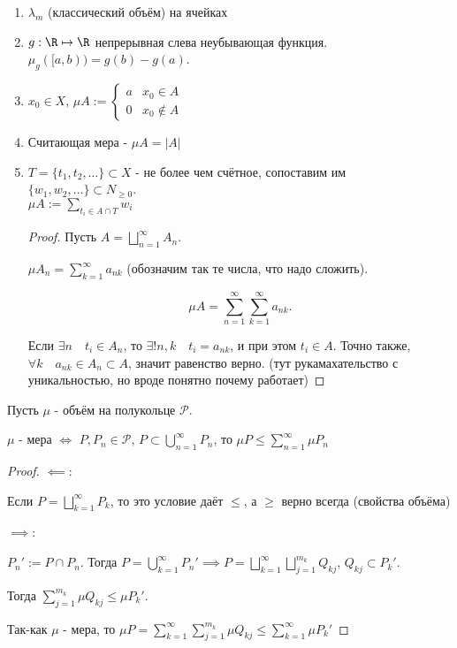 \begin{example}[меры] \thmslashn

    \begin{enumerate}
        \item $\lambda_{m}$ (классический объём) на ячейках
        \item $g : \R \mapsto \R$ непрерывная слева неубывающая функция. $\mu_{g}([a, b)) = g(b) - g(a)$.
        \item $x_0\in X$, $\mu A := \begin{cases}
                a & x_0\in A\\
                0 & x_0 \not\in A
        \end{cases}$
    \item Считающая мера - $\mu A = |A|$
    \item $T = \{t_1, t_2, \ldots\} \subset X $ - не более чем счётное, сопоставим им $\{w_1, w_2, \ldots\} \subset N_{\ge 0}$.\\
        $\mu A := \sum\limits_{t_{i}\in A\cap T} w_{i}$
        \begin{proof} \thmslashn
        
            Пусть $A = \bigsqcup\limits_{n=1}^{\infty} A_{n}$.

            $\mu A_{n} = \sum\limits_{k=1}^{\infty} a_{nk}$ (обозначим так те числа, что надо сложить).

            \[ \mu A = \sum\limits_{n=1}^{\infty} \sum\limits_{k=1}^{\infty} a_{nk} .\]

            Если $\exists{n}\quad t_{i}\in A_{n}$, то $\exists!{n, k}\quad t_{i} = a_{nk}$, и при этом $t_{i}\in A$. Точно также, $\forall{k}\quad a_{nk}\in A_{n} \subset A$, значит равенство верно. (тут рукамахательство с уникальностью, но вроде понятно почему работает)
        \end{proof}
    \end{enumerate}
\end{example}
\begin{theorem} \thmslashn

    Пусть $\mu$ - объём на полукольце $\mathcal{P}$.

    $\mu$ - мера $\iff$ $P, P_{n}\in \mathcal{P}$, $P \subset \bigcup\limits_{n=1}^{\infty} P_{n}$, то $\mu P \le \sum\limits_{n=1}^{\infty} \mu P_{n}$
    \begin{proof} \thmslashn
    
        $\impliedby$:

        Если $P = \bigsqcup\limits_{k=1}^{\infty} P_{k}$, то это условие даёт $\le $, а $\ge $ верно всегда (свойства объёма)

        $\implies$:

        $P_{n}' := P\cap P_{n}$. Тогда $P = \bigcup\limits_{k=1}^{\infty} P_{n}' \implies P = \bigsqcup\limits_{k=1}^{\infty} \bigsqcup\limits_{j=1}^{m_{k}} Q_{kj}$, $Q_{kj} \subset P_{k}'$.

        Тогда $\sum\limits_{j=1}^{m_{k}} \mu Q_{kj} \le \mu P_{k}' $.

        Так-как $\mu$ - мера, то $\mu P = \sum\limits_{k=1}^{\infty} \sum\limits_{j=1}^{m_k} \mu Q_{kj} \le \sum\limits_{k=1}^{\infty} \mu P_{k}'$
    \end{proof}
\end{theorem}
